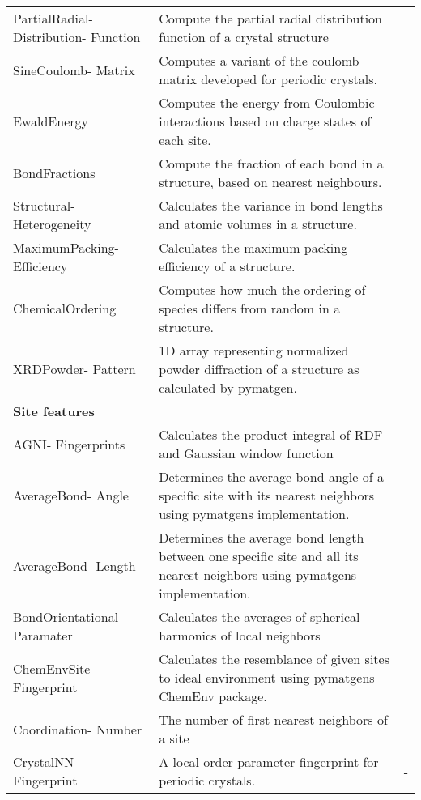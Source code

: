 \begin{center}
\begin{longtable}{M{3.0cm} M{6.0cm} M{2.5cm}}
  PartialRadial- Distribution- Function & Compute the partial radial distribution function of a crystal structure & \cite{Schuett2014}  \\
  SineCoulomb- Matrix & Computes a variant of the coulomb matrix developed for periodic crystals. & \cite{Faber2015}  \\
  EwaldEnergy & Computes the energy from Coulombic interactions based on charge states of each site. & \cite{Ewald1921}  \\
  BondFractions & Compute the fraction of each bond in a structure, based on nearest neighbours. & \cite{Hansen2015}  \\
  Structural- Heterogeneity & Calculates the variance in bond lengths and atomic volumes in a structure. & \cite{Ward2017}  \\
  MaximumPacking- Efficiency & Calculates the maximum packing efficiency of a structure. & \cite{Ward2017} \\
  ChemicalOrdering & Computes how much the ordering of species differs from random in a structure. & \cite{Ward2017}  \\
  XRDPowder- Pattern & 1D array representing normalized powder diffraction of a structure as calculated by pymatgen. & \cite{Ong2013} \\
  \hline
  \textbf{Site features} & & \\
  \hline
  AGNI- Fingerprints & Calculates the product integral of RDF and Gaussian window function & \cite{Botu2014}  \\
  AverageBond- Angle & Determines the average bond angle of a specific site with its nearest neighbors using pymatgens implementation. & \cite{Jong2016}  \\
  AverageBond- Length & Determines the average bond length between one specific site and all its nearest neighbors using pymatgens implementation. & \cite{Jong2016}  \\
  BondOrientational- Paramater & Calculates the averages of spherical harmonics of local neighbors & \cite{Seko2017, Steinhardt1983}  \\
  ChemEnvSite Fingerprint & Calculates the resemblance of given sites to ideal environment using pymatgens ChemEnv package. & \cite{Waroquiers2017, Zimmermann2017}  \\
  Coordination- Number & The number of first nearest neighbors of a site & \cite{Zimmermann2017}  \\
  CrystalNN- Fingerprint & A local order parameter fingerprint for periodic crystals. & -  \\

\end{longtable}
\end{center}
